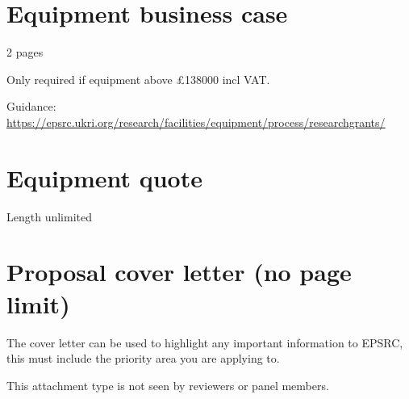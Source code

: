 \documentclass[11pt,a4paper]{report}
\begin{document}
\chapter{Equipment business case}

2 pages

Only required if equipment above £138000 incl VAT.

Guidance: \url{https://epsrc.ukri.org/research/facilities/equipment/process/researchgrants/}
\pagebreak


\pagebreak

\chapter{Equipment quote}

Length unlimited
\pagebreak

\chapter{Proposal cover letter (no page limit)}

The cover letter can be used to highlight any important information to EPSRC,
this must include the priority area you are applying to.

This attachment type is not seen by reviewers or panel members.

\pagebreak



%

\end{document}
